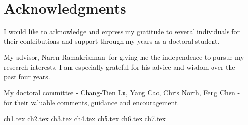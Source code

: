 \documentclass[12pt,dvips]{report}
\begin{document}
\vfill



\pagebreak


\chapter*{Acknowledgments}
I would like to acknowledge and express my gratitude to several individuals for their contributions and support through my years as a doctoral student.

My advisor, Naren Ramakrishnan, for giving me the independence to pursue my research interests. I am especially grateful for his advice and wisdom over the past four years.

My doctoral committee - Chang-Tien Lu, Yang Cao, Chris North, Feng Chen - for their valuable
comments, guidance and encouragement.


\tableofcontents
\pagebreak

\listoffigures
\pagebreak

\listoftables
\pagebreak

\pagestyle{myheadings}

{ch1.tex}
{ch2.tex}
{ch3.tex}
{ch4.tex}
{ch5.tex}
{ch6.tex}
{ch7.tex}



%





\end{document}
